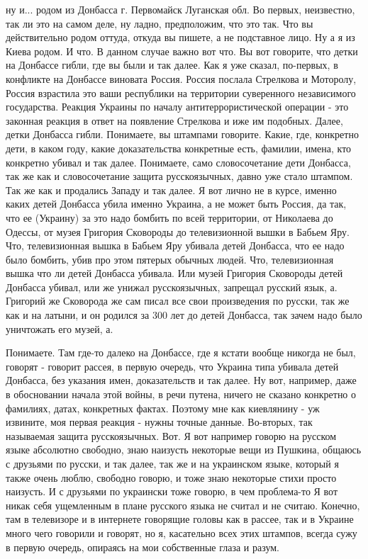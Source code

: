 
 
 
 
 

ну и... родом из Донбасса г. Первомайск Луганская обл. Во первых, неизвестно,
так ли это на самом деле, ну ладно, предположим, что это так. Что вы
действительно родом оттуда, откуда вы пишете, а не подставное лицо. Ну а я из
Киева родом. И что. В данном случае важно вот что. Вы вот говорите, что детки
на Донбассе гибли, где вы были и так далее. Как я уже сказал, по-первых, в
конфликте на Донбассе виновата Россия. Россия послала Стрелкова и Моторолу,
Россия взрастила это ваши республики на территории суверенного независимого
государства. Реакция Украины по началу антитеррористической операции - это
законная реакция в ответ на появление Стрелкова и иже им подобных. Далее, детки
Донбасса гибли. Понимаете, вы штампами говорите. Какие, где, конкретно дети, в
каком году, какие доказательства конкретные есть, фамилии, имена, кто конкретно
убивал и так далее. Понимаете, само словосочетание дети Донбасса, так же как и
словосочетание защита русскоязычных, давно уже стало штампом. Так же как и
продались Западу и так далее. Я вот лично не в курсе, именно каких детей
Донбасса убила именно Украина, а не может быть Россия, да так, что ее (Украину)
за это надо бомбить по всей территории, от Николаева до Одессы, от музея
Григория Сковороды до телевизионной вышки в Бабьем Яру. Что, телевизионная
вышка в Бабьем Яру убивала детей Донбасса, что ее надо было бомбить, убив про
этом пятерых обычных людей. Что, телевизионная вышка что ли детей Донбасса
убивала. Или музей Григория Сковороды детей Донбасса убивал, или же унижал
русскоязычных, запрещал русский язык, а. Григорий же Сковорода же сам писал все
свои произведения по русски, так же как и на латыни, и он родился за 300 лет до
детей Донбасса, так зачем надо было уничтожать его музей, а.

Понимаете. Там где-то далеко на Донбассе, где я кстати вообще никогда не был,
говорят - говорит рассея, в первую очередь, что Украина типа убивала детей
Донбасса, без указания имен, доказательств и так далее. Ну вот, например, даже
в обосновании начала этой войны, в речи путена, ничего не сказано конкретно о
фамилиях, датах, конкретных фактах. Поэтому мне как киевлянину - уж извините,
моя первая реакция - нужны точные данные. Во-вторых, так называемая защита
русскоязычных. Вот. Я вот например говорю на русском языке абсолютно свободно,
знаю наизусть некоторые вещи из Пушкина, общаюсь с друзьями по русски, и так
далее, так же и на украинском языке, который я также очень люблю, свободно
говорю, и тоже знаю некоторые стихи просто наизусть. И с друзьями по украински
тоже говорю, в чем проблема-то Я вот никак себя ущемленным в плане русского
языка не считал и не считаю. Конечно, там в телевизоре и в интернете говорящие
головы как в рассее, так и в Украине много чего говорили и говорят, но я,
касательно всех этих штампов, всегда сужу в первую очередь, опираясь на мои
собственные глаза и разум.

